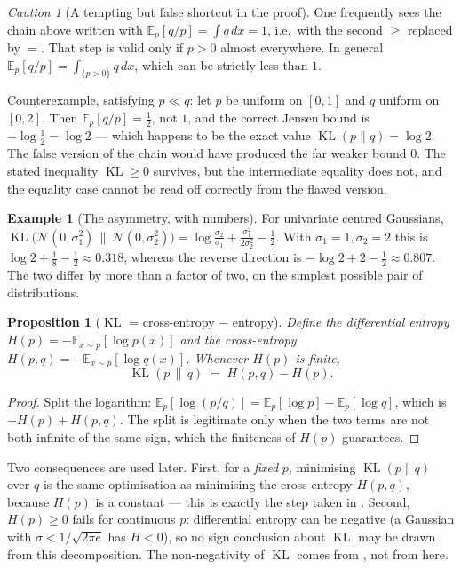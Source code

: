 \documentclass[11pt,a4paper]{report}
\newtheorem{proposition}[proposition]{Proposition}
\theoremstyle{definition}
\newtheorem{example}[example]{Example}
\theoremstyle{remark}
\newtheorem{caution}[caution]{Caution}
\DeclareMathOperator{\KL}{KL}
\newcommand{\EE}{\mathbb E}
\begin{document}
\begin{caution}[A tempting but false shortcut in the proof]
\label{caution:kl-jensen-trap}
One frequently sees the chain above written with $\EE_p[q/p]=\int q\,dx=1$,
i.e.\ with the second $\ge$ replaced by $=$. That step is valid only if
$p>0$ almost everywhere. In general $\EE_p[q/p]=\int_{\{p>0\}}q\,dx$, which
can be strictly less than $1$.

Counterexample, satisfying $p\ll q$: let $p$ be uniform on $[0,1]$ and $q$
uniform on $[0,2]$. Then $\EE_p[q/p]=\tfrac12$, not $1$, and the correct
Jensen bound is $-\log\tfrac12=\log 2$ --- which happens to be the exact
value $\KL(p\|q)=\log 2$. The false version of the chain would have produced
the far weaker bound $0$. The stated inequality $\KL\ge0$ survives, but the
intermediate equality does not, and the equality case cannot be read off
correctly from the flawed version.
\end{caution}

\begin{example}[The asymmetry, with numbers]
\label{ex:kl-asymmetry}
For univariate centred Gaussians,
$\KL\bigl(\mathcal N(0,\sigma_1^2)\,\|\,\mathcal N(0,\sigma_2^2)\bigr)
=\log\frac{\sigma_2}{\sigma_1}+\frac{\sigma_1^2}{2\sigma_2^2}-\frac12$.
With $\sigma_1=1,\sigma_2=2$ this is $\log2+\tfrac18-\tfrac12\approx0.318$,
whereas the reverse direction is $-\log2+2-\tfrac12\approx0.807$. The two
differ by more than a factor of two, on the simplest possible pair of
distributions.
\end{example}

\begin{proposition}[$\KL$ = cross-entropy $-$ entropy]
\label{prop:kl-entropy-decomposition}
Define the \emph{differential entropy} $H(p)=-\EE_{x\sim p}[\log p(x)]$ and
the \emph{cross-entropy} $H(p,q)=-\EE_{x\sim p}[\log q(x)]$. Whenever $H(p)$
is finite,
\[
\KL(p\,\|\,q) \;=\; H(p,q) - H(p) .
\]
\end{proposition}

\begin{proof}
Split the logarithm: $\EE_p[\log(p/q)]=\EE_p[\log p]-\EE_p[\log q]$, which is
$-H(p)+H(p,q)$. The split is legitimate only when the two terms are not both
infinite of the same sign, which the finiteness of $H(p)$ guarantees.
\end{proof}

Two consequences are used later. First, for a \emph{fixed} $p$, minimising
$\KL(p\|q)$ over $q$ is the same optimisation as minimising the cross-entropy
$H(p,q)$, because $H(p)$ is a constant --- this is exactly the step taken in
. Second, $H(p)\ge0$ fails for continuous $p$: differential
entropy can be negative (a Gaussian with $\sigma<1/\sqrt{2\pi e}$ has
$H<0$), so no sign conclusion about $\KL$ may be drawn from this
decomposition. The non-negativity of $\KL$ comes from
, not from here.
\end{document}
